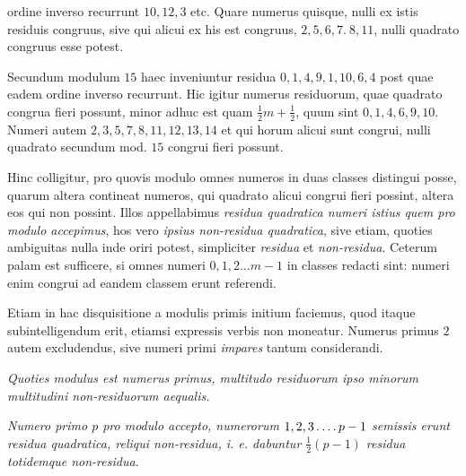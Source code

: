 ordine inverso recurrunt $10,12,3$ etc. Quare numerus quisque, nulli ex istis residuis congruus, sive qui alicui ex his est congruus, $2,5,6,7.\ 8,11$, nulli quadrato congruus esse potest.

Secundum modulum $15$ haec inveniuntur residua $0,1,4,9,1,10,6,4$ post quae eadem ordine inverso recurrunt. Hic igitur numerus residuorum, quae quadrato congrua fieri possunt, minor adhuc est quam $\tfrac12m+\tfrac12$, quum sint $0,1,4,6,9,10$. Numeri autem $2,3,5,7,8,11,12,13,14$ et qui horum alicui sunt congrui, nulli quadrato secundum mod. $15$ congrui fieri possunt.

Hinc colligitur, pro quovis modulo omnes numeros in duas classes distingui posse, quarum altera contineat numeros, qui quadrato alicui congrui fieri possint, altera eos qui non possint. Illos appellabimus \emph{residua quadratica numeri istius quem pro modulo accepimus}, hos vero \emph{ipsius non-residua quadratica}, sive etiam, quoties ambiguitas nulla inde oriri potest, simpliciter \emph{residua} et \emph{non-residua}. Ceterum palam est sufficere, si omnes numeri $0,1,2\ldots m-1$ in classes redacti sint: numeri enim congrui ad eandem classem erunt referendi.

Etiam in hac disquisitione a modulis primis initium faciemus, quod itaque subintelligendum erit, etiamsi expressis verbis non moneatur. Numerus primus $2$ autem excludendus, sive numeri primi \emph{impares} tantum considerandi.

\begin{center}\small\emph{Quoties modulus est numerus primus, multitudo residuorum ipso minorum multitudini non-residuorum aequalis.}\end{center}

\emph{Numero primo $p$ pro modulo accepto, numerorum $1,2,3\mathinner{\ldotp\ldotp\ldotp\ldotp} p-1$ semissis erunt residua quadratica, reliqui non-residua, i. e. dabuntur $\tfrac12(p-1)$ residua totidemque non-residua.}

